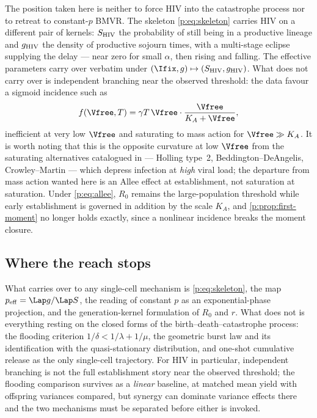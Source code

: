 The position taken here is neither to force HIV into the catastrophe process
nor to retreat to constant-$p$ BMVR. The skeleton \cref{p:eq:skeleton}
carries HIV on a different pair of kernels: $S_{\rm HIV}$ the probability of
still being in a productive lineage and $g_{\rm HIV}$ the density of
productive sojourn times, with a multi-stage eclipse supplying the delay ---
near zero for small $\alpha$, then rising and falling. The effective
parameters carry over verbatim under
$(\Ifix,g)\mapsto(S_{\rm HIV},g_{\rm HIV})$. What does not carry over is
independent branching near the observed threshold: the data favour a sigmoid
incidence such as
\begin{equation}
f(\Vfree,T)=\gamma T\,\Vfree\cdot\frac{\Vfree}{K_A+\Vfree},
\label{p:eq:allee}
\end{equation}
inefficient at very low $\Vfree$ and saturating to mass action for
$\Vfree\gg K_A$. It is worth noting that this is the opposite curvature at
low $\Vfree$ from the saturating alternatives catalogued in
\cite{ciupe2024incorporating} --- Holling type~2, Beddington--DeAngelis,
Crowley--Martin --- which depress infection at \emph{high} viral load; the
departure from mass action wanted here is an Allee effect at establishment,
not saturation at saturation. Under \cref{p:eq:allee}, $R_0$ remains the
large-population threshold while early establishment is governed in addition
by the scale $K_A$, and \cref{p:prop:first-moment} no longer holds exactly,
since a nonlinear incidence breaks the moment closure.

\subsection{Where the reach stops}

What carries over to any single-cell mechanism is \cref{p:eq:skeleton}, the
map $p_{\rm eff}=\Lap g/\Lap S$, the reading of constant $p$ as an
exponential-phase projection, and the generation-kernel formulation of $R_0$
and $r$. What does not is everything resting on the closed forms of the
birth--death--catastrophe process: the flooding criterion
$1/\delta<1/\lambda+1/\mu$, the geometric burst law and its identification
with the quasi-stationary distribution, and one-shot cumulative release as
the only single-cell trajectory. For HIV in particular, independent
branching is not the full establishment story near the observed threshold;
the flooding comparison survives as a \emph{linear} baseline, at matched
mean yield with offspring variances compared, but synergy can dominate
variance effects there and the two mechanisms must be separated before
either is invoked.

